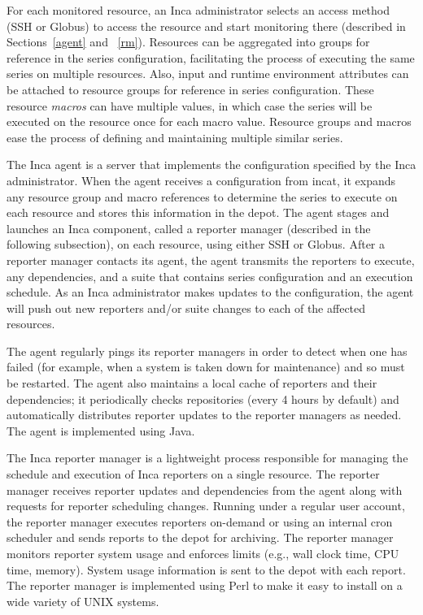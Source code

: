 \documentclass[times,10pt,twocolumn]{article}
\begin{document}
For each monitored resource, an Inca administrator selects an access method
(SSH or Globus) to access the resource and start monitoring there (described
in Sections~\ref{agent} and ~\ref{rm}).  Resources can be aggregated into
groups for reference in the series configuration, facilitating the
process of executing the same series on multiple resources.  Also,
input and runtime environment attributes can be attached to resource groups
for reference in series configuration.
These resource \emph{macros} can have multiple values, in which
case the series will be executed on the resource once for each macro value.
Resource groups and macros ease the process of defining and maintaining
multiple similar series.

\label{agent}

The Inca agent is a server that implements the configuration specified by the
Inca administrator.  When the agent receives a configuration from incat,
it expands any resource group and macro references to determine
the series to execute on each resource and stores this
information in the depot.  The agent stages and
launches an Inca component, called a reporter manager (described in the
following subsection), on each resource, using either SSH or Globus.  After a
reporter manager contacts its agent, the agent transmits the reporters to
execute, any dependencies, and a suite that contains series
configuration and an execution schedule.  As an Inca administrator makes
updates to the configuration, the agent will push out new reporters and/or
suite changes to each of the affected resources.

The agent regularly pings its reporter managers in order to detect when one has
failed (for example, when a system is taken down for maintenance) and so must
be restarted.  The agent also maintains a local cache of reporters and their
dependencies; it periodically checks repositories (every 4 hours by default)
and automatically distributes reporter updates to the reporter managers as
needed.  The agent is implemented using Java. 

\label{rm}

The Inca reporter manager is a lightweight process responsible for managing
the schedule and execution of Inca reporters on a single resource. The
reporter manager receives reporter updates and dependencies from the agent
along with requests for reporter scheduling changes.  Running under a regular
user account, the reporter manager executes reporters on-demand or using an
internal cron scheduler and sends reports to the depot for archiving. The
reporter manager monitors reporter system usage 
and enforces limits (e.g., wall clock time, CPU time, memory).
System usage information is sent to the depot with each report. 
The reporter manager is implemented using Perl to make it easy to install on
a wide variety of UNIX systems.
\end{document}
